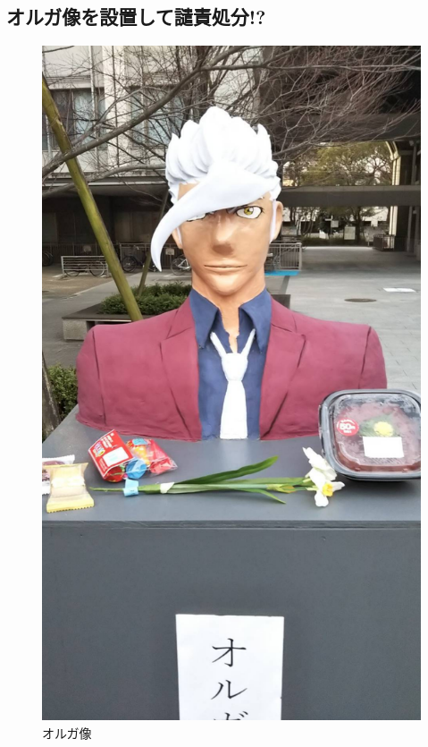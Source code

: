 \newpage

\subsection{オルガ像を設置して譴責処分!?}

\begin{figure}
    \includegraphics[width=8zw]{gazo/oruga.pdf}
    \captionsetup{labelformat=empty,labelsep=none}
    \caption{オルガ像}
\end{figure}

